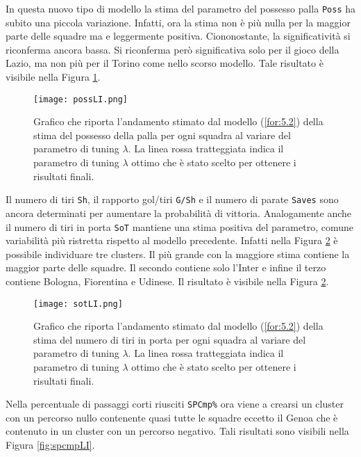 In questa nuovo tipo di modello la stima del parametro del possesso palla \texttt{Poss} ha subito una piccola variazione. Infatti, ora la stima non è più nulla per la maggior parte delle squadre ma e leggermente positiva. Ciononostante, la significatività si riconferma ancora bassa. Si riconferma però significativa solo per il gioco della Lazio, ma non più per il Torino come nello scorso modello. Tale risultato è visibile nella Figura \ref{fig:possLI}.\\
\begin{figure}[]
	\begin{center}
		\texttt{[image: possLI.png]}
		\caption{Grafico che riporta l'andamento stimato dal modello (\ref{for:5.2}) della stima del possesso della palla per ogni squadra al variare del parametro di tuning $\lambda$. La linea rossa tratteggiata indica il parametro di tuning $\lambda$ ottimo che è stato scelto per ottenere i risultati finali.} \label{fig:possLI}
	\end{center}
\end{figure}
Il numero di tiri \texttt{Sh}, il rapporto gol/tiri \texttt{G/Sh} e il numero di parate \texttt{Saves} sono ancora determinati per aumentare la probabilità di vittoria. Analogamente anche il numero di tiri in porta \texttt{SoT} mantiene una stima positiva del parametro, comune variabilità più ristretta rispetto al modello precedente. Infatti nella Figura \ref{fig:sotLI} è possibile individuare tre clusters. Il più grande con la maggiore stima contiene la maggior parte delle squadre. Il secondo contiene solo l'Inter e infine il terzo contiene Bologna, Fiorentina e Udinese. Il risultato è visibile nella Figura \ref{fig:sotLI}.\\
\begin{figure}[htbp]
	\begin{center}
		\texttt{[image: sotLI.png]}
		\caption{Grafico che riporta l'andamento stimato dal modello (\ref{for:5.2}) della stima del numero di tiri in porta per ogni squadra al variare del parametro di tuning $\lambda$. La linea rossa tratteggiata indica il parametro di tuning $\lambda$ ottimo che è stato scelto per ottenere i risultati finali.} \label{fig:sotLI}
	\end{center}
\end{figure}
Nella percentuale di passaggi corti riusciti \texttt{SPCmp\%} ora viene a crearsi un cluster con un percorso nullo contenente quasi tutte le squadre eccetto il Genoa che è contenuto in un cluster con un percorso negativo. Tali risultati sono visibili nella Figura \ref{fig:spcmpLI}.\\

